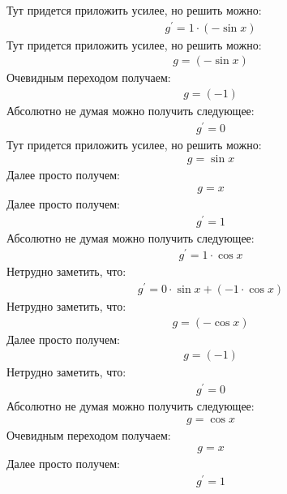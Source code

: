 \documentclass[12pt,a4paper]{scrartcl}
\begin{document}
Тут придется приложить усилее, но решить можно:
\begin{gather}\label{eq:f2a57c80}g^\prime  = 1 \cdot  \left(- \sin{ x } \right) \end{gather}
Тут придется приложить усилее, но решить можно:
\begin{gather}\label{eq:f2a578c0}g  =  \left(- \sin{ x } \right) \end{gather}
Очевидным переходом получаем:
\begin{gather}\label{eq:f2a57cb0}g  = \left(-1\right)\end{gather}
Абсолютно не думая можно получить следующее:
\begin{gather}\label{eq:f2a57d70}g^\prime  = 0\end{gather}
Тут придется приложить усилее, но решить можно:
\begin{gather}\label{eq:f2a57ce0}g  =  \sin{ x } \end{gather}
Далее просто получем:
\begin{gather}\label{eq:f2a57d10}g  = x\end{gather}
Далее просто получем:
\begin{gather}\label{eq:f2a57ef0}g^\prime  = 1\end{gather}
Абсолютно не думая можно получить следующее:
\begin{gather}\label{eq:f2a57ec0}g^\prime  = 1 \cdot  \cos{ x } \end{gather}
Нетрудно заметить, что:
\begin{gather}\label{eq:f2a57b90}g^\prime  = 0 \cdot  \sin{ x }  +  \left(-1 \cdot  \cos{ x } \right) \end{gather}
Нетрудно заметить, что:
\begin{gather}\label{eq:f2a57d10}g  =  \left(- \cos{ x } \right) \end{gather}
Далее просто получем:
\begin{gather}\label{eq:f2a57cb0}g  = \left(-1\right)\end{gather}
Нетрудно заметить, что:
\begin{gather}\label{eq:f2a57dd0}g^\prime  = 0\end{gather}
Абсолютно не думая можно получить следующее:
\begin{gather}\label{eq:f2a57ef0}g  =  \cos{ x } \end{gather}
Очевидным переходом получаем:
\begin{gather}\label{eq:f2a57d40}g  = x\end{gather}
Далее просто получем:
\begin{gather}\label{eq:f2a58070}g^\prime  = 1\end{gather}
\end{document}
